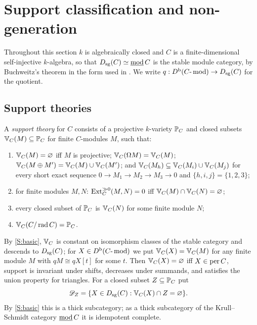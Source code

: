 \section{Support classification and non-generation}\label{sec:support}

Throughout this section \(k\) is algebraically closed and \(C\) is a finite-dimensional self-injective \(k\)-algebra, so that \(D_{\mathrm{sg}}(C)\simeq\underline{\operatorname{mod}}\,C\) is the stable module category, by Buchweitz's theorem \cite{Buchweitz} in the form used in .  We write \(q:D^{\mathrm b}(C\text{-}\operatorname{mod})\to D_{\mathrm{sg}}(C)\) for the quotient.

\subsection{Support theories}
\begin{definition}\label{def:support-theory}
A \emph{support theory} for \(C\) consists of a projective \(k\)-variety \(\mathbb P_C\) and closed subsets \(\mathbb V_C(M)\subseteq\mathbb P_C\) for finite \(C\)-modules \(M\), such that:
\begin{enumerate}[label=\textup{(S\arabic*)}]
\item\label{S:basic} \(\mathbb V_C(M)=\varnothing\) iff \(M\) is projective; \(\mathbb V_C(\Omega M)=\mathbb V_C(M)\); \(\mathbb V_C(M\oplus M')=\mathbb V_C(M)\cup\mathbb V_C(M')\); and \(\mathbb V_C(M_h)\subseteq\mathbb V_C(M_i)\cup\mathbb V_C(M_j)\) for every short exact sequence \(0\to M_1\to M_2\to M_3\to0\) and \(\{h,i,j\}=\{1,2,3\}\);
\item\label{S:pair} for finite modules \(M,N\): \(\operatorname{Ext}^{\gg0}_C(M,N)=0\) iff \(\mathbb V_C(M)\cap\mathbb V_C(N)=\varnothing\);
\item\label{S:realise} every closed subset of \(\mathbb P_C\) is \(\mathbb V_C(N)\) for some finite module \(N\);
\item\label{S:full} \(\mathbb V_C(C/\operatorname{rad} C)=\mathbb P_C\).
\end{enumerate}
\end{definition}

By \ref{S:basic}, \(\mathbb V_C\) is constant on isomorphism classes of the stable category and descends to \(D_{\mathrm{sg}}(C)\); for \(X\in D^{\mathrm b}(C\text{-}\operatorname{mod})\) we put \(\mathbb V_C(X)=\mathbb V_C(M)\) for any finite module \(M\) with \(qM\cong qX[t]\) for some \(t\).  Then \(\mathbb V_C(X)=\varnothing\) iff \(X\in\operatorname{per} C\), support is invariant under shifts, decreases under summands, and satisfies the union property for triangles.  For a closed subset \(Z\subseteq\mathbb P_C\) put
\begin{equation}\label{eq:DZ}
 \mathscr D_Z=\{X\in D_{\mathrm{sg}}(C):\mathbb V_C(X)\cap Z=\varnothing\}.
\end{equation}
By \ref{S:basic} this is a thick subcategory; as a thick subcategory of the Krull--Schmidt category \(\underline{\operatorname{mod}}\,C\) it is idempotent complete.

